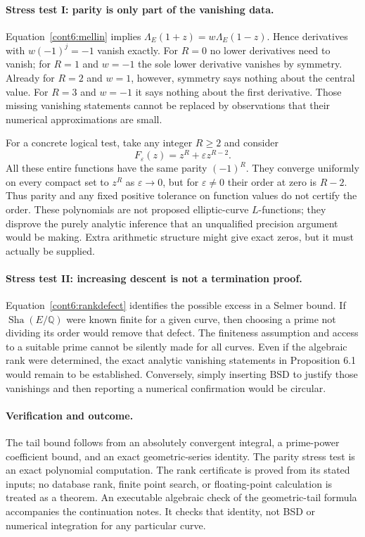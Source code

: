 \documentclass[11pt]{article}
\begin{document}
\paragraph{Stress test I: parity is only part of the vanishing data.}
Equation~\eqref{cont6:mellin} implies
$\Lambda_E(1+z)=w\Lambda_E(1-z)$. Hence derivatives with
$w(-1)^j=-1$ vanish exactly. For $R=0$ no lower derivatives need to
vanish; for $R=1$ and $w=-1$ the sole lower derivative vanishes by
symmetry. Already for $R=2$ and $w=1$, however, symmetry says nothing
about the central value. For $R=3$ and $w=-1$ it says nothing about the
first derivative. Those missing vanishing statements cannot be replaced
by observations that their numerical approximations are small.

For a concrete logical test, take any integer $R\ge2$ and consider
\[
 F_\varepsilon(z)=z^R+\varepsilon z^{R-2}.
\]
All these entire functions have the same parity $(-1)^R$. They converge
uniformly on every compact set to $z^R$ as $\varepsilon\to0$, but for
$\varepsilon\ne0$ their order at zero is $R-2$. Thus parity and any
fixed positive tolerance on function values do not certify the order.
These polynomials are not proposed elliptic-curve $L$-functions; they
disprove the purely analytic inference that an unqualified precision
argument would be making. Extra arithmetic structure might give exact
zeros, but it must actually be supplied.

\paragraph{Stress test II: increasing descent is not a termination proof.}
Equation~\eqref{cont6:rankdefect} identifies the possible excess in a
Selmer bound. If $\operatorname{Sha}(E/\mathbb Q)$ were known finite for a given curve,
then choosing a prime not dividing its order would remove that defect.
The finiteness assumption and access to a suitable prime cannot be
silently made for all curves. Even if the algebraic rank were determined,
the exact analytic vanishing statements in Proposition 6.1 would remain
to be established. Conversely, simply inserting BSD to justify those
vanishings and then reporting a numerical confirmation would be circular.

\paragraph{Verification and outcome.}
The tail bound follows from an absolutely convergent integral, a
prime-power coefficient bound, and an exact geometric-series identity.
The parity stress test is an exact polynomial computation. The rank
certificate is proved from its stated inputs; no database rank, finite
point search, or floating-point calculation is treated as a theorem.
An executable algebraic check of the geometric-tail formula accompanies
the continuation notes. It checks that identity, not BSD or numerical
integration for any particular curve.
\end{document}

